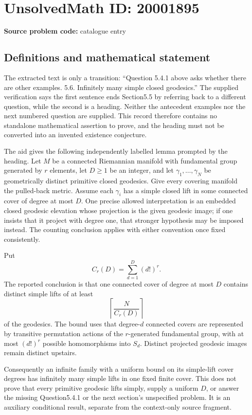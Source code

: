 \documentclass[11pt]{article}
\begin{document}
\section*{UnsolvedMath ID: 20001895}
\textbf{Source problem code:} catalogue entry
\subsection{Definitions and mathematical statement}
The extracted text is only a transition: ``Question 5.4.1 above asks whether there are other examples. 5.6. Infinitely many simple closed geodesics.'' The supplied verification says the first sentence ends Section5.5 by referring back to a different question, while the second is a heading. Neither the antecedent examples nor the next numbered question are supplied. This record therefore contains no standalone mathematical assertion to prove, and the heading must not be converted into an invented existence conjecture.

The aid gives the following independently labelled lemma prompted by the heading. Let \(M\) be a connected Riemannian manifold with fundamental group generated by \(r\) elements, let \(D\geq1\) be an integer, and let \(\gamma_1,\ldots,\gamma_N\) be geometrically distinct primitive closed geodesics. Give every covering manifold the pulled-back metric. Assume each \(\gamma_i\) has a simple closed lift in some connected cover of degree at most \(D\). One precise allowed interpretation is an embedded closed geodesic elevation whose projection is the given geodesic image; if one insists that it project with degree one, that stronger hypothesis may be imposed instead. The counting conclusion applies with either convention once fixed consistently.

Put
\[
 C_r(D)=\sum_{d=1}^D(d!)^r.
\]
The reported conclusion is that one connected cover of degree at most \(D\) contains distinct simple lifts of at least
\[
 \left\lceil\frac{N}{C_r(D)}\right\rceil
\]
of the geodesics. The bound uses that degree-\(d\) connected covers are represented by transitive permutation actions of the \(r\)-generated fundamental group, with at most \((d!)^r\) possible homomorphisms into \(S_d\). Distinct projected geodesic images remain distinct upstairs.

Consequently an infinite family with a uniform bound on its simple-lift cover degrees has infinitely many simple lifts in one fixed finite cover. This does not prove that every primitive geodesic lifts simply, supply a uniform \(D\), or answer the missing Question5.4.1 or the next section's unspecified problem. It is an auxiliary conditional result, separate from the context-only source fragment.
\end{document}
